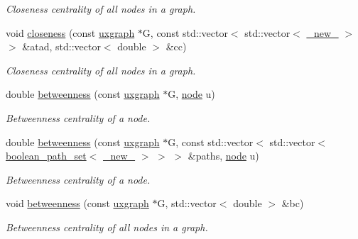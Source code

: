 \begin{DoxyCompactItemize}
\begin{DoxyCompactList}\small\item\em Closeness centrality of all nodes in a graph. \end{DoxyCompactList}\item 
void \hyperlink{namespacelgraph_1_1networks_1_1metrics_1_1centralities_a56d2d61c30688914a57cc7a55733582d}{closeness} (const \hyperlink{classlgraph_1_1uxgraph}{uxgraph} $\ast$G, const std\+::vector$<$ std\+::vector$<$ \hyperlink{namespacelgraph_a2836f966c1c36b43da337d8907728ec0}{\+\_\+new\+\_\+} $>$ $>$ \&atad, std\+::vector$<$ double $>$ \&cc)
\begin{DoxyCompactList}\small\item\em Closeness centrality of all nodes in a graph. \end{DoxyCompactList}\item 
double \hyperlink{namespacelgraph_1_1networks_1_1metrics_1_1centralities_a0834cb72864b1bdf574c212c5cafbce9}{betweenness} (const \hyperlink{classlgraph_1_1uxgraph}{uxgraph} $\ast$G, \hyperlink{namespacelgraph_a397169dd66adf725210a30fb7251773e}{node} u)
\begin{DoxyCompactList}\small\item\em Betweenness centrality of a node. \end{DoxyCompactList}\item 
double \hyperlink{namespacelgraph_1_1networks_1_1metrics_1_1centralities_a9c5f210ed96ff6bcb1dfb45aaba3f947}{betweenness} (const \hyperlink{classlgraph_1_1uxgraph}{uxgraph} $\ast$G, const std\+::vector$<$ std\+::vector$<$ \hyperlink{namespacelgraph_afad432931ba600ab1628d5c9595986c5}{boolean\+\_\+path\+\_\+set}$<$ \hyperlink{namespacelgraph_a2836f966c1c36b43da337d8907728ec0}{\+\_\+new\+\_\+} $>$ $>$ $>$ \&paths, \hyperlink{namespacelgraph_a397169dd66adf725210a30fb7251773e}{node} u)
\begin{DoxyCompactList}\small\item\em Betweenness centrality of a node. \end{DoxyCompactList}\item 
void \hyperlink{namespacelgraph_1_1networks_1_1metrics_1_1centralities_a9bc71e78d93bb18cd0b6d69c7c88da8a}{betweenness} (const \hyperlink{classlgraph_1_1uxgraph}{uxgraph} $\ast$G, std\+::vector$<$ double $>$ \&bc)
\begin{DoxyCompactList}\small\item\em Betweenness centrality of all nodes in a graph. \end{DoxyCompactList}\item 

\end{DoxyCompactItemize}
